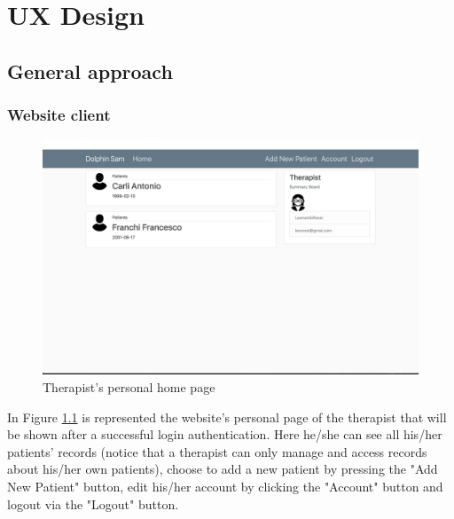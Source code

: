 \chapter{UX Design}
\section{General approach}
\subsection{Website client}
\begin{figure}[h!]
	\includegraphics[width=\textwidth]{images/UX/website/4-patientsList}
	\caption{Therapist's personal home page}
	\label{fig:webPatList}
\end{figure}
In Figure \ref{fig:webPatList} is represented the website's personal page of the therapist that will be shown after a successful login authentication. Here he/she can see all his/her patients' records (notice that a therapist can only manage and access records about his/her own patients), choose to add a new patient by pressing the "Add New Patient" button, edit his/her account by clicking the "Account" button and logout via the "Logout" button.

